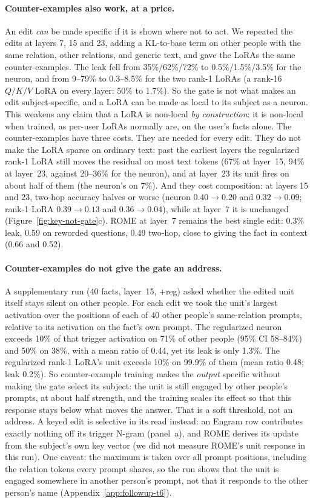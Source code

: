 \documentclass[11pt]{article}
\begin{document}
\paragraph{Counter-examples also work, at a price.} An edit \emph{can}
be made specific if it is shown where not to act. We repeated the
edits at layers 7, 15 and 23, adding a KL-to-base term on other people
with the same relation, other relations, and generic text, and gave the
LoRAs the same counter-examples. The leak fell from 35\%/62\%/72\%
to 0.5\%/1.5\%/3.5\% for the neuron, and from 9--79\% to 0.3--8.5\%
for the two rank-1 LoRAs (a rank-16 $Q/K/V$ LoRA on every layer: 50\%
to 1.7\%). So the gate is not what makes an edit subject-specific, and
a LoRA can be made as local to its subject as a neuron. This weakens
any claim that a LoRA is non-local \emph{by construction}: it is
non-local when trained, as per-user LoRAs normally are, on the user's
facts alone. The counter-examples have three costs. They are needed for
every edit. They do not make the LoRA sparse on ordinary text: past the
earliest layers the regularized rank-1 LoRA still moves the residual
on most text tokens (67\% at layer~15, 94\% at layer~23, against
20--36\% for the neuron), and at layer~23 its unit fires on about half
of them (the neuron's on 7\%). And they
cost composition: at layers 15 and 23, two-hop accuracy halves or worse
(neuron $0.40\to0.20$ and $0.32\to0.09$; rank-1 LoRA $0.39\to0.13$ and
$0.36\to0.04$), while at layer~7 it is unchanged
(Figure~\ref{fig:key-not-gate}c). ROME at layer~7 remains the best
single edit: 0.3\% leak, 0.59 on reworded questions, 0.49 two-hop,
close to giving the fact in context (0.66 and 0.52).

\paragraph{Counter-examples do not give the gate an address.} A
supplementary run (40 facts, layer~15, +reg) asked whether the edited
unit itself stays silent on other people. For each edit we took the
unit's largest activation over the positions of each of 40 other
people's same-relation prompts, relative to its activation on the
fact's own prompt. The regularized neuron exceeds 10\% of that trigger
activation on 71\% of other people (95\% CI 58--84\%) and 50\% on 38\%,
with a mean ratio of 0.44, yet its leak is only 1.3\%. The
regularized rank-1 LoRA's unit exceeds 10\% on 99.9\% of them (mean ratio
0.48; leak 0.2\%). So counter-example training makes the
\emph{output} specific without making the gate select its subject: the
unit is still engaged by other people's prompts, at about half
strength, and the training scales its effect so that this response
stays below what moves the answer. That is a soft threshold, not an
address. A keyed edit is selective in its read instead: an Engram row
contributes exactly nothing off its trigger N-gram (panel~a), and ROME
derives its update from the subject's own key vector (we did not
measure ROME's unit response in this run). One caveat: the maximum is
taken over all prompt positions, including the relation tokens every
prompt shares, so the run shows that the unit is engaged somewhere in
another person's prompt, not that it responds to the other person's
name (Appendix~\ref{app:followup-t6}).
\end{document}
